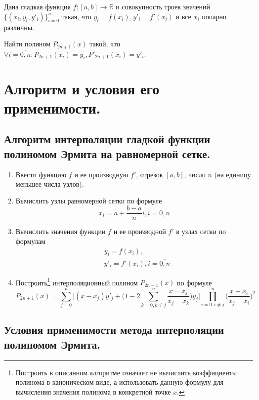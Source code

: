 \documentclass[a4paper, 12pt]{article}
\begin{document}
	Дана гладкая функция $f:[a,b]\rightarrow \mathbb{R}$ и совокупность троек значений $\{(x_i,y_i,y'_i)\}_{i=0}^n$ такая, что $y_i=f(x_i), y'_i=f'(x_i)$ и все $x_i$ попарно различны. 
	
	Найти полином $P_{2n+1}(x)$ такой, что $\forall i=\overline{0,n} : P_{2n+1}(x_i)=y_i, P'_{2n+1}(x_i) =y'_i$.
	
	\section{Алгоритм и условия его применимости.}
	
	\subsection{Алгоритм интерполяции гладкой функции полиномом Эрмита на равномерной сетке.}
	
	\begin{enumerate}
		\item Ввести функцию $f$ и ее производную $f'$, отрезок $[a,b]$, число $n$ (на единицу меньшее числа узлов).
		\item Вычислить узлы равномерной сетки по формуле
		\begin{equation}
			x_i=a+\frac{b-a}{n}i, i=\overline{0,n}
		\end{equation}
		\item Вычислить значения функции $f$ и ее производной $f'$ в узлах сетки по формулам
		\begin{equation}
			\begin{aligned}
			&y_i=f(x_i),\\
			&y'_i=f'(x_i), i=\overline{0,n}
			\end{aligned}
		\end{equation}
		\item Построить\footnote{Построить в описанном алгоритме означает не вычислить коэффициенты полинома в каноническом виде, а использовать данную формулу для вычисления значения полинома в конкретной точке $x$.} интерполяционный полином $P_{2n+1}(x)$ по формуле
		\begin{equation}
			P_{2n+1}(x)=\sum\limits_{j=0}^n\bigg[(x-x_j)y'_j+\bigg(1-2\sum\limits_{k=0,k\neq j}^n\frac{x-x_j}{x_j-x_k}\bigg)y_j\bigg]\prod\limits_{i=0,i\neq j}^n\bigg(\frac{x-x_i}{x_j-x_i}\bigg)^2
		\end{equation}	
		
	\end{enumerate}

	\subsection{Условия применимости метода интерполяции полиномом Эрмита.}
	
\end{document}
